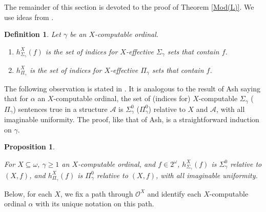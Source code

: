 \documentclass{article}
\newtheorem{prop}[thm]{Proposition}
\newtheorem{defn}{Definition}
\begin{document}

The remainder of this section is devoted to the proof of Theorem \ref{Mod(L)}.  We use ideas from \cite{HKL}.  

\begin{defn}

Let $\gamma$ be an $X$-computable ordinal.  

\begin{enumerate}

\item  $h^X_{\Sigma_\gamma}(f)$ is the set of indices for $X$-effective $\Sigma_\gamma$ sets that contain $f$.  

\item  $h^X_{\Pi_\gamma}$ is the set of indices for $X$-effective $\Pi_\gamma$ sets that contain $f$.

\end{enumerate}
\end{defn}

The following observation is stated in \cite{HKL}.  It is analogous to the result of Ash saying that for $\alpha$ an $X$-computable ordinal, the set of (indices for) $X$-computable $\Sigma_\gamma$ ($\Pi_\gamma$) sentences true in a structure $\mathcal{A}$ is $\Sigma^0_\gamma$ ($\Pi^0_\gamma$) relative to $X$ and $\mathcal{A}$, with all imaginable uniformity.  The proof, like that of Ash, is a straightforward induction on $\gamma$.  

\begin{prop}
\label{Ash} 

For $X\subseteq\omega$, $\gamma\geq 1$ an $X$-computable ordinal, and $f\in 2^\omega$,  $h^X_{\Sigma_\gamma}(f)$ is $\Sigma^0_\gamma$ relative to $(X,f)$, and $h^X_{\Pi_\gamma}(f)$ is $\Pi^0_\gamma$ relative to $(X,f)$, with all imaginable uniformity.  

\end{prop}

Below, for each $X$, we fix a path through $\mathcal{O}^X$ and identify each $X$-computable ordinal $\alpha$ with its unique notation on this path.  
\end{document}
